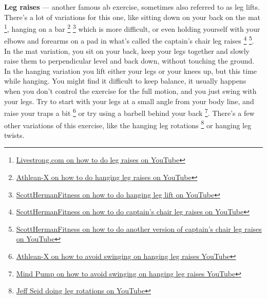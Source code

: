 \documentclass[openany, 12pt]{book}
\begin{document}
        \textbf{Leg raises}
        --- another famous ab exercise, sometimes also referred to as leg lifts. There's a lot of variations for this one, like sitting down on your back on the mat
        \footnote{\href{https://www.youtube.com/watch?v=JB2oyawG9KI}{Livestrong.com on how to do leg raises on YouTube}}, hanging on a bar
        \footnote{\href{https://www.youtube.com/watch?v=Pr1ieGZ5atk}{Athlean-X on how to do hanging leg raises on YouTube}}
        \footnote{\href{https://www.youtube.com/watch?v=hdng3Nm1x_E}{ScottHermanFitness on how to do hanging leg lift on YouTube}}
        which is more difficult, or even holding yourself with your elbows and forearms on a pad in what's called the captain's chair leg raises
        \footnote{\href{https://www.youtube.com/watch?v=ghwdoXHeiIk}{ScottHermanFitness on how to do captain's chair leg raises on YouTube}}
        \footnote{\href{https://www.youtube.com/watch?v=CU2-V80_JsA}{ScottHermanFitness on how to do another version of captain's chair leg raises on YouTube}}.
        In the mat variation, you sit on your back, keep your legs together and slowly raise them to perpendicular level and back down, without touching the ground.
        In the hanging variation you lift either your legs or your knees up, but this time while hanging. You might find it difficult to keep balance, it usually happens when you
        don't control the exercise for the full motion, and you just swing with your legs. Try to start with your legs at a small angle from your body line, and raise your traps a bit
        \footnote{\href{https://www.youtube.com/watch?v=7qPYYw3lPSA}{Athlean-X on how to avoid swinging on hanging leg raises YouTube}} or try using a barbell behind your back
        \footnote{\href{https://www.youtube.com/watch?v=0A4qGKbKMbE}{Mind Pump on how to avoid swinging on hanging leg raises YouTube}}. There's a few other variations of this exercise,
        like the hanging leg rotations
        \footnote{\href{https://www.youtube.com/watch?v=LtSbWD-Z9m8}{Jeff Seid doing leg rotations on YouTube}}
        or hanging leg twists.
\end{document}
